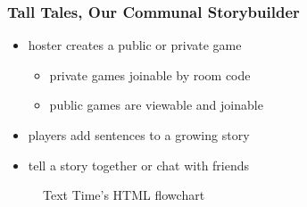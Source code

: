 \documentclass[t]{beamer}
\begin{document}
    \begin{frame}
        \frametitle{Tall Tales, Our Communal Storybuilder}
        \begin{itemize}
          \item hoster creates a public or private game
          \begin{itemize}
            \item private games joinable by room code
            \item public games are viewable and joinable
          \end{itemize}
          \item players add sentences to a growing story 
          \item tell a story together or chat with friends
        \end{itemize}
        \begin{figure}
            \begin{center}
            \end{center}
            \caption{Text Time's HTML flowchart}
        \end{figure}
    \end{frame}
\end{document}
